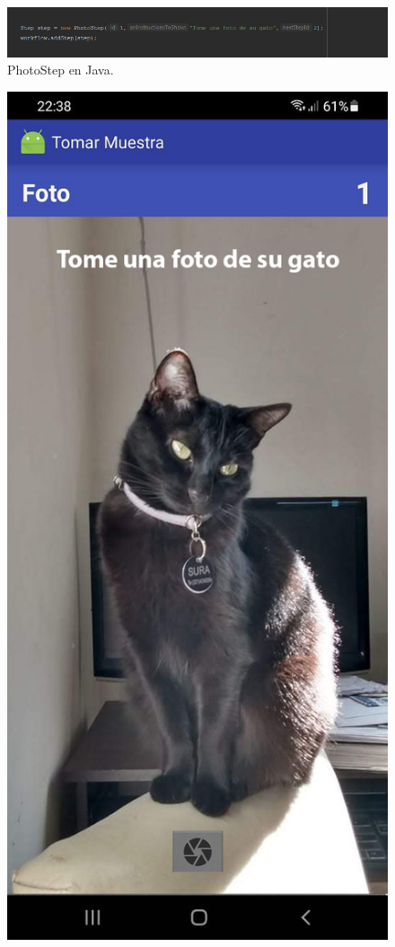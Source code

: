 \begin{figure}[H]
  \centering
    \includegraphics[scale=0.6]{50-anexos/C-steps/photo_java.png} 
    \caption{PhotoStep en Java.}
\end{figure}


\begin{figure}[H]
  \centering
   \includegraphics[scale=0.3]{50-anexos/C-steps/photo_screen1.jpg} 

\end{figure}
